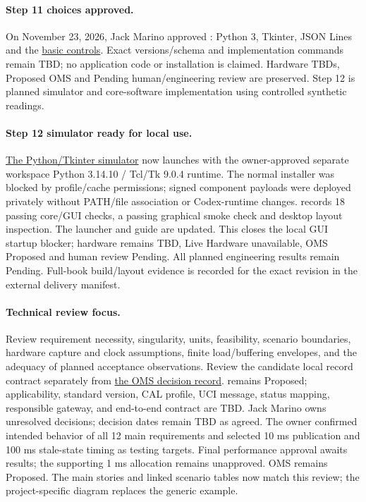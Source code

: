\paragraph{Step 11 choices approved.} On November 23, 2026, Jack Marino approved : Python 3, Tkinter, JSON Lines and the \hyperref[Table:ApprovedControls]{basic controls}. Exact versions/schema and implementation commands remain TBD; no application code or installation is claimed. Hardware TBDs, Proposed OMS and Pending human/engineering review are preserved. Step 12 is planned simulator and core-software implementation using controlled synthetic readings.

\paragraph{Step 12 simulator ready for local use.} \hyperref[Section:SimulatorPrototype]{The Python/Tkinter simulator} now launches with the owner-approved separate workspace Python 3.14.10 / Tcl/Tk 9.0.4 runtime. The normal installer was blocked by profile/cache permissions; signed component payloads were deployed privately without PATH/file association or Codex-runtime changes.  records 18 passing core/GUI checks, a passing graphical smoke check and desktop layout inspection. The launcher and guide are updated. This closes the local GUI startup blocker; hardware remains TBD, Live Hardware unavailable, OMS Proposed and human review Pending. All planned engineering results remain Pending. Full-book build/layout evidence is recorded for the exact revision in the external delivery manifest.

\paragraph{Technical review focus.}
Review requirement necessity, singularity, units, feasibility, scenario
boundaries, hardware capture and clock assumptions, finite load/buffering
envelopes, and the adequacy of planned acceptance observations. Review the
candidate local record contract separately from
\hyperref[Section:ProposedOMSBoundary]{the OMS decision record}.
 remains Proposed; applicability, standard version,
CAL profile, UCI message, status mapping, responsible gateway, and end-to-end
contract are TBD. Jack Marino owns unresolved decisions; decision dates remain
TBD as agreed. The owner confirmed intended behavior of all 12 main requirements and selected 10 ms publication and 100 ms stale-state timing as testing targets. Final performance approval awaits results; the supporting 1 ms allocation remains unapproved. OMS remains Proposed. The main stories and linked scenario tables now match this review; the project-specific diagram replaces the generic example.

